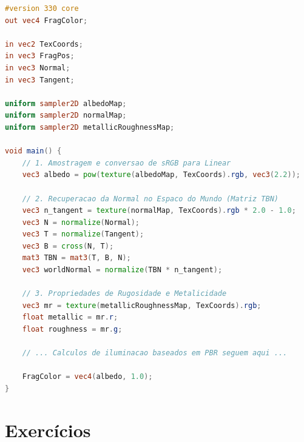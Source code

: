 \begin{lstlisting}[language=GLSL, caption={Fragment Shader PBR com Normal Mapping}]
#version 330 core
out vec4 FragColor;

in vec2 TexCoords;
in vec3 FragPos;
in vec3 Normal;
in vec3 Tangent;

uniform sampler2D albedoMap;
uniform sampler2D normalMap;
uniform sampler2D metallicRoughnessMap;

void main() {
    // 1. Amostragem e conversao de sRGB para Linear
    vec3 albedo = pow(texture(albedoMap, TexCoords).rgb, vec3(2.2));
    
    // 2. Recuperacao da Normal no Espaco do Mundo (Matriz TBN)
    vec3 n_tangent = texture(normalMap, TexCoords).rgb * 2.0 - 1.0;
    vec3 N = normalize(Normal);
    vec3 T = normalize(Tangent);
    vec3 B = cross(N, T);
    mat3 TBN = mat3(T, B, N);
    vec3 worldNormal = normalize(TBN * n_tangent);
    
    // 3. Propriedades de Rugosidade e Metalicidade
    vec3 mr = texture(metallicRoughnessMap, TexCoords).rgb;
    float metallic = mr.r;
    float roughness = mr.g;
    
    // ... Calculos de iluminacao baseados em PBR seguem aqui ...
    
    FragColor = vec4(albedo, 1.0);
}
\end{lstlisting}

\section*{Exercícios}

